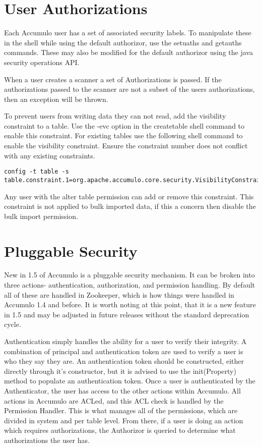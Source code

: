 \section{User Authorizations}

Each Accumulo user has a set of associated security labels. To manipulate
these in the shell while using the default authorizor, use the setuaths and getauths commands.
These may also be modified for the default authorizor using the java security operations API. 

When a user creates a scanner a set of Authorizations is passed. If the
authorizations passed to the scanner are not a subset of the users
authorizations, then an exception will be thrown.

To prevent users from writing data they can not read, add the visibility
constraint to a table. Use the -evc option in the createtable shell command to
enable this constraint. For existing tables use the following shell command to
enable the visibility constraint. Ensure the constraint number does not
conflict with any existing constraints.
  
\small
\begin{verbatim}
config -t table -s table.constraint.1=org.apache.accumulo.core.security.VisibilityConstraint
\end{verbatim}
\normalsize

Any user with the alter table permission can add or remove this constraint.
This constraint is not applied to bulk imported data, if this a concern then
disable the bulk import permission.

\section{Pluggable Security}

New in 1.5 of Accumulo is a pluggable security mechanism. It can be broken into three actions-
authentication, authorization, and permission handling. By default all of these are handled in
Zookeeper, which is how things were handled in Accumulo 1.4 and before. It is worth noting at this
point, that it is a new feature in 1.5 and may be adjusted in future releases without the standard
deprecation cycle.

Authentication simply handles the ability for a user to verify their integrity. A combination of 
principal and authentication token are used to verify a user is who they say they are. An 
authentication token should be constructed, either directly through it's constructor, but it is 
advised to use the init(Property) method to populate an authentication token. Once a user is 
authenticated by the Authenticator, the user has access to the other actions within Accumulo. All 
actions in Accumulo are ACLed, and this ACL check is handled by the Permission Handler. This is what 
manages all of the permissions, which are divided in system and per table level. From there, if a 
user is doing an action which requires authorizations, the Authorizor is queried to determine what 
authorizations the user has.

